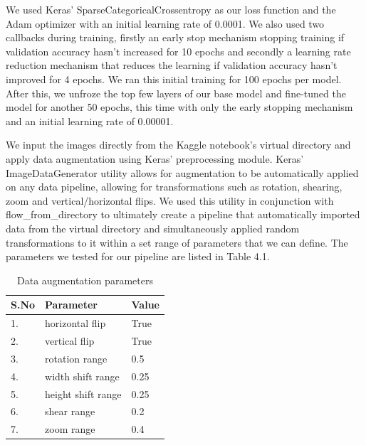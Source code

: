 We used Keras’ SparseCategoricalCrossentropy as our loss function and the Adam optimizer with an initial learning rate of 0.0001. We also used two callbacks during training, firstly an early stop mechanism stopping training if validation accuracy hasn’t increased for 10 epochs and secondly a learning rate reduction mechanism that reduces the learning if validation accuracy hasn’t improved for 4 epochs. We ran this initial training for 100 epochs per model. After this, we unfroze the top few layers of our base model and fine-tuned the model for another 50 epochs, this time with only the early stopping mechanism and an initial learning rate of 0.00001. 


We input the images directly from the Kaggle notebook’s virtual directory and apply data augmentation using Keras’ preprocessing module. Keras’ ImageDataGenerator utility allows for augmentation to be automatically applied on any data pipeline, allowing for transformations such as rotation, shearing, zoom and vertical/horizontal flips. We used this utility in conjunction with flow\_from\_directory to ultimately create a pipeline that automatically imported data from the virtual directory and simultaneously applied random transformations to it within a set range of parameters that we can define. The parameters we tested for our pipeline are listed in Table 4.1.


    
\begin{table}[H]
\begin{center}
\begin{tabular}{|l|l|l|}
\hline
S.No & Parameter                       & Value \\ \hline
1.   & horizontal flip & True          \\ \hline
2.   & vertical flip      & True          \\ \hline
3.   & rotation range      & 0.5          \\ \hline
4.   & width shift range     & 0.25          \\ \hline
5.   & height shift range     & 0.25          \\ \hline
6.   & shear range     & 0.2          \\ \hline
7.   & zoom range     & 0.4          \\ \hline
\end{tabular}
\end{center}
\caption{Data augmentation parameters}
\end{table}
 
